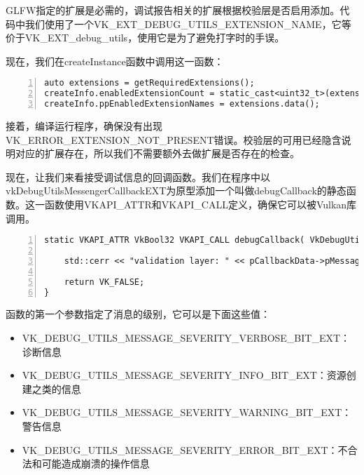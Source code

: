 \documentclass{ctexart}
\begin{document}
GLFW指定的扩展是必需的，调试报告相关的扩展根据校验层是否启用添加。代码中我们使用了一个VK\_EXT\_DEBUG\_UTILS\_EXTENSION\_NAME，它等价于VK\_EXT\_debug\_utils，使用它是为了避免打字时的手误。

现在，我们在createInstance函数中调用这一函数：

\begin{lstlisting}[language={[ANSI]C},keywordstyle=\color{blue!70},commentstyle=\color{red!50!green!50!blue!50},frame=shadowbox, rulesepcolor=\color{red!20!green!20!blue!20},basicstyle=\small,numbers=left, numberstyle=\tiny,breaklines=true]
auto extensions = getRequiredExtensions();
createInfo.enabledExtensionCount = static_cast<uint32_t>(extensions.size());
createInfo.ppEnabledExtensionNames = extensions.data();
\end{lstlisting}

接着，编译运行程序，确保没有出现VK\_ERROR\_EXTENSION\_NOT\_PRESENT错误。校验层的可用已经隐含说明对应的扩展存在，所以我们不需要额外去做扩展是否存在的检查。

现在，让我们来看接受调试信息的回调函数。我们在程序中以vkDebugUtilsMessengerCallbackEXT为原型添加一个叫做debugCallback的静态函数。这一函数使用VKAPI\_ATTR和VKAPI\_CALL定义，确保它可以被Vulkan库调用。

\begin{lstlisting}[language={[ANSI]C},keywordstyle=\color{blue!70},commentstyle=\color{red!50!green!50!blue!50},frame=shadowbox, rulesepcolor=\color{red!20!green!20!blue!20},basicstyle=\small,numbers=left, numberstyle=\tiny,breaklines=true]
static VKAPI_ATTR VkBool32 VKAPI_CALL debugCallback( VkDebugUtilsMessageSeverityFlagBitsEXT messageSeverity, VkDebugUtilsMessageTypeFlagsEXT messageType, const VkDebugUtilsMessengerCallbackDataEXT* pCallbackData, void* pUserData) {

	std::cerr << "validation layer: " << pCallbackData->pMessage << std::endl;

	return VK_FALSE;
}
\end{lstlisting}

函数的第一个参数指定了消息的级别，它可以是下面这些值：

\begin{itemize}
	\item VK\_DEBUG\_UTILS\_MESSAGE\_SEVERITY\_VERBOSE\_BIT\_EXT：诊断信息
	\item VK\_DEBUG\_UTILS\_MESSAGE\_SEVERITY\_INFO\_BIT\_EXT：资源创建之类的信息
	\item VK\_DEBUG\_UTILS\_MESSAGE\_SEVERITY\_WARNING\_BIT\_EXT：警告信息
	\item VK\_DEBUG\_UTILS\_MESSAGE\_SEVERITY\_ERROR\_BIT\_EXT：不合法和可能造成崩溃的操作信息
\end{itemize}
\end{document}
